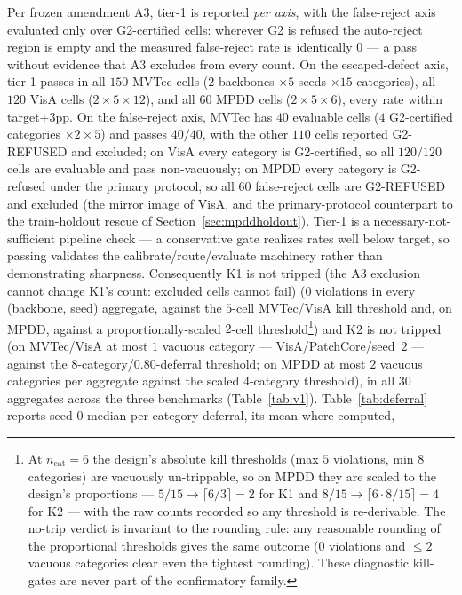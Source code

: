 \documentclass[11pt]{article}
\begin{document}
Per frozen amendment A3, tier-1 is reported \emph{per axis}, with the false-reject axis
evaluated only over G2-certified cells: wherever G2 is refused the auto-reject region is empty
and the measured false-reject rate is identically $0$ --- a pass without evidence that A3
excludes from every count. On the escaped-defect axis, tier-1 passes in all $150$
MVTec cells ($2$ backbones $\times 5$ seeds $\times 15$ categories), all $120$
VisA cells ($2 \times 5 \times 12$), and all $60$ MPDD cells ($2 \times 5 \times 6$),
every rate within target$+3$pp. On the false-reject
axis, MVTec has $40$ evaluable cells ($4$ G2-certified categories $\times 2 \times 5$) and
passes $40/40$, with the other $110$ cells reported G2-REFUSED and excluded; on VisA
every category is G2-certified, so all $120/120$ cells are evaluable and pass
non-vacuously; on MPDD every category is G2-refused under the primary protocol, so all $60$
false-reject cells are G2-REFUSED and excluded (the mirror image of VisA, and the primary-protocol
counterpart to the train-holdout rescue of Section~\ref{sec:mpddholdout}). Tier-1 is a necessary-not-sufficient pipeline check --- a conservative gate
realizes rates well below target, so passing validates the calibrate/route/evaluate machinery
rather than demonstrating sharpness. Consequently K1 is not tripped (the A3 exclusion
cannot change K1's count: excluded cells cannot fail) ($0$ violations in every
(backbone, seed) aggregate, against the $5$-cell MVTec/VisA kill threshold and, on MPDD, against
a proportionally-scaled $2$-cell threshold\footnote{At $n_{\text{cat}}=6$ the design's absolute
kill thresholds (max $5$ violations, min $8$ categories) are vacuously un-trippable, so on MPDD
they are scaled to the design's proportions --- $5/15\to\lceil 6/3\rceil=2$ for K1 and
$8/15\to\lceil 6\cdot 8/15\rceil=4$ for K2 --- with the raw counts recorded so any threshold is
re-derivable. The no-trip verdict is invariant to the rounding rule: any reasonable rounding of
the proportional thresholds gives the same outcome ($0$ violations and $\le 2$ vacuous categories
clear even the tightest rounding). These diagnostic kill-gates are never part of the confirmatory family.}) and K2 is
not tripped (on MVTec/VisA at most $1$ vacuous category --- VisA/PatchCore/seed~$2$ --- against the
$8$-category/$0.80$-deferral threshold; on MPDD at most $2$ vacuous categories per aggregate
against the scaled $4$-category threshold), in all $30$ aggregates across the three
benchmarks (Table~\ref{tab:v1}). Table~\ref{tab:deferral} reports seed-$0$ median per-category deferral, its mean where computed,
\end{document}

